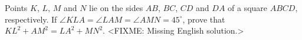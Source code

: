 \problem
Points $K$, $L$, $M$ and $N$ lie on the sides $AB$, $BC$, $CD$ and $DA$ of a
square $ABCD$, respectively.
If $\angle KLA = \angle LAM = \angle AMN = 45^\circ$, prove that
$KL^2 + AM^2 = LA^2 + MN^2$.
\solution
<FIXME: Missing English solution.>
\endproblem
